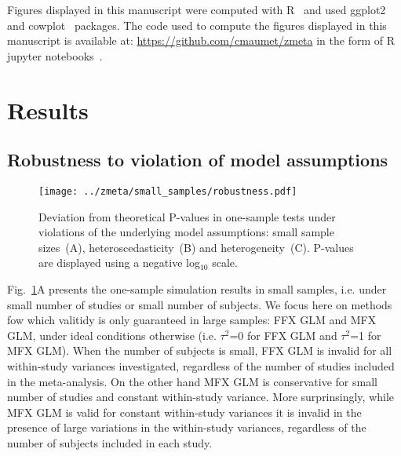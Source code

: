 \documentclass[preprint]{elsarticle}
\newcommand{\varBetween}{\tau^2}
\newcommand{\nSubjects}[1][i]{n_{#1}}
\begin{document}
Figures displayed in this manuscript were computed with R~\cite{RCoreTeam2016} and used ggplot2~\cite{Hadley2009} and cowplot~\cite{Wilke2016} packages. The code used to compute the figures displayed in this manuscript is available at: \url{https://github.com/cmaumet/zmeta} in the form of R jupyter notebooks~\cite{Perez2007}.

\section{Results}\label{sec:results}

\subsection{Robustness to violation of model assumptions}

\begin{figure}[h]
	\centering
 	\texttt{[image: ../zmeta/small\_samples/robustness.pdf]}
	\caption{Deviation from theoretical P-values in one-sample tests under violations of the underlying model assumptions: small sample sizes~(A), heteroscedasticity~(B) and heterogeneity~(C). P-values are displayed using a negative log$_{10}$ scale.}
	\label{fig:robustness}
\end{figure}



Fig.~\ref{fig:robustness}A presents the one-sample simulation results in small samples, i.e. under small number of studies or small number of subjects. We focus here on methods fow which valitidy is only guaranteed in large samples: FFX GLM and MFX GLM, under ideal conditions otherwise (i.e. $\varBetween$=0 for FFX GLM and $\varBetween$=1 for MFX GLM). When the number of subjects is small, FFX GLM is invalid for all within-study variances investigated, regardless of the number of studies included in the meta-analysis. On the other hand MFX GLM is conservative for small number of studies and constant within-study variance. More surprinsingly, while MFX GLM is valid for constant within-study variances it is invalid in the presence of large variations in the within-study variances, regardless of the number of subjects included in each study. 
\end{document}
